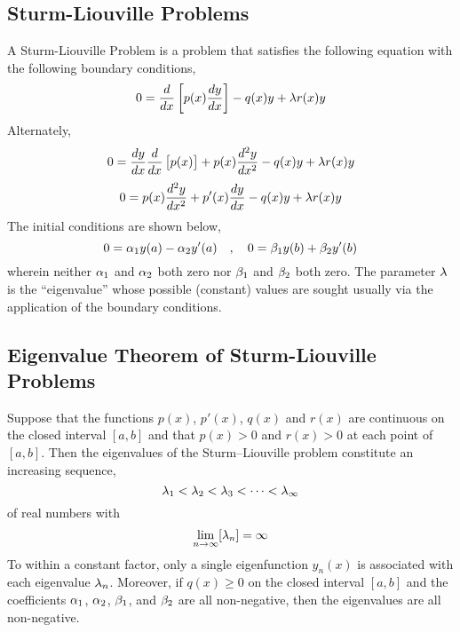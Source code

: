 \documentclass[a4paper, 12pt]{report}
\begin{document}
\begin{center}


\chapter{Sturm-Liouville Problems}
\begin{comment}
\end{comment}
A Sturm-Liouville Problem is a problem that satisfies the following equation with the following boundary conditions,
$$0 = \frac{d}{dx}\left[p(x)\frac{dy}{dx}\right]-q(x)y+\lambda r(x)y$$
Alternately,
$$0 = \frac{dy}{dx}\frac{d}{dx}\left[p(x)\right] + p(x)\frac{d^2y}{dx^2}-q(x)y+\lambda r(x)y$$
$$0 = p(x)\frac{d^2y}{dx^2} + p'(x)\frac{dy}{dx}-q(x)y+\lambda r(x)y$$
The initial conditions are shown below,
$$0 = \alpha_1y(a) - \alpha_2y'(a)\quad,\quad 0 = \beta_1y(b) + \beta_2y'(b)$$                                        wherein neither $\alpha_1$ and $\alpha_2$ both zero nor $\beta_1$ and $\beta_2$ both zero. The parameter $\lambda$ is the “eigenvalue” whose possible (constant) values are sought usually via the application of the boundary conditions.    
\section{Eigenvalue Theorem of Sturm-Liouville Problems}
\begin{comment}
\end{comment}
Suppose that the functions $p(x)$, $p'(x)$, $q(x)$ and $r(x)$ are continuous on the closed interval $[a,b]$ and that $p(x)>0$ and $r(x)>0$ at each point of $[a,b]$. Then the eigenvalues of the Sturm–Liouville problem constitute an increasing sequence,
$$\lambda_1 < \lambda_2 < \lambda_3 < \dots <\lambda_\infty$$
of real numbers with
$$\lim_{n\to\infty}[\lambda_n] = \infty$$To within a constant factor, only a single eigenfunction $y_n(x)$ is associated with each eigenvalue $\lambda_n$. Moreover, if $q(x)\geq0$ on the closed interval $[a,b]$ and the coefficients $\alpha_1$, $\alpha_2$, $\beta_1$, and $\beta_2$ are all non-negative, then the eigenvalues are all non-negative.

\end{center}
\end{document}

